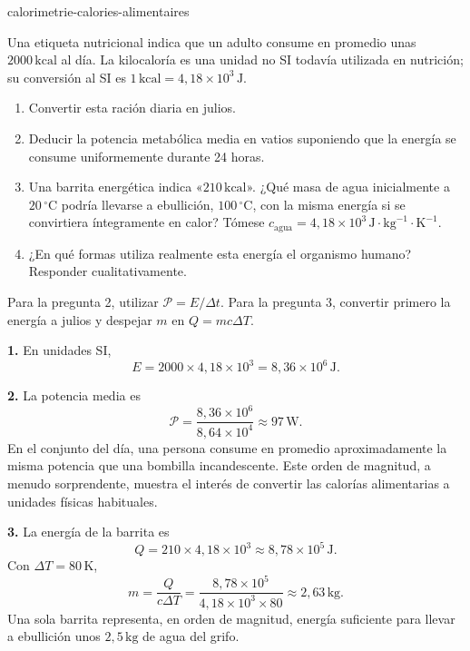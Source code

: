 \begin{exo}{calorimetrie-calories-alimentaires}

Una etiqueta nutricional indica que un adulto consume en promedio unas $2000\,\text{kcal}$ al día. La kilocaloría es una unidad no SI todavía utilizada en nutrición; su conversión al SI es $1\,\text{kcal}=4{,}18\times10^3\,\text{J}$.

\begin{enumerate}
  \item Convertir esta ración diaria en julios.
  \item Deducir la potencia metabólica media en vatios suponiendo que la energía se consume uniformemente durante 24 horas.
  \item Una barrita energética indica «$210\,\text{kcal}$». ¿Qué masa de agua inicialmente a $20\,^\circ\text{C}$ podría llevarse a ebullición, $100\,^\circ\text{C}$, con la misma energía si se convirtiera íntegramente en calor? Tómese $c_{\text{agua}}=4{,}18\times10^3\,\text{J}\!\cdot\!\text{kg}^{-1}\!\cdot\!\text{K}^{-1}$.
  \item ¿En qué formas utiliza realmente esta energía el organismo humano? Responder cualitativamente.
\end{enumerate}

\begin{indication}
Para la pregunta 2, utilizar $\mathcal P=E/\Delta t$. Para la pregunta 3, convertir primero la energía a julios y despejar $m$ en $Q=mc\Delta T$.
\end{indication}

\begin{solution}
\textbf{1.} En unidades SI,
\[
E=2000\times4{,}18\times10^3=8{,}36\times10^6\,\text{J}.
\]

\textbf{2.} La potencia media es
\[
\mathcal P=\frac{8{,}36\times10^6}{8{,}64\times10^4}\approx97\,\text{W}.
\]
En el conjunto del día, una persona consume en promedio aproximadamente la misma potencia que una bombilla incandescente. Este orden de magnitud, a menudo sorprendente, muestra el interés de convertir las calorías alimentarias a unidades físicas habituales.

\textbf{3.} La energía de la barrita es
\[
Q=210\times4{,}18\times10^3\approx8{,}78\times10^5\,\text{J}.
\]
Con $\Delta T=80\,\text{K}$,
\[
m=\frac{Q}{c\Delta T}
=\frac{8{,}78\times10^5}{4{,}18\times10^3\times80}
\approx2{,}63\,\text{kg}.
\]
Una sola barrita representa, en orden de magnitud, energía suficiente para llevar a ebullición unos $2{,}5\,\text{kg}$ de agua del grifo.


\end{solution}
\end{exo}
